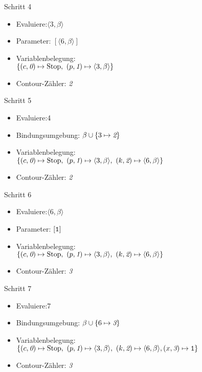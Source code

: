 \documentclass{beamer}
\begin{document}
\begin{frame}
\begin{overprint}
\onslide<+>
\begin{block}{Schritt 4}
\begin{itemize}
\item Evaluiere:\phantom{$\langle$}$\langle 3, \beta\rangle$
\item Parameter: $[\langle6, \beta\rangle]$
\item Variablenbelegung: \\
$\{ (c,\textit 0) \mapsto \text{Stop},\ (p,\textit 1) \mapsto \langle 3 ,\beta\rangle\}$
\item Contour-Zähler: \textit2
\end{itemize}
\end{block}

\onslide<+>
\begin{block}{Schritt 5}
\begin{itemize}
\item Evaluiere:\phantom{$\langle$}4
\item Bindungsumgebung: $\beta \cup \{ 3 \mapsto \textit 2 \}$
\item Variablenbelegung: \\
$\{ (c,\textit 0) \mapsto \text{Stop},\ (p,\textit 1) \mapsto \langle 3 ,\beta\rangle,\ (k,\textit 2) \mapsto \langle6, \beta\rangle\}$
\item Contour-Zähler: \textit2
\end{itemize}
\end{block}

\onslide<+>
\begin{block}{Schritt 6}
\begin{itemize}
\item Evaluiere:\phantom{$\langle$}$\langle6, \beta\rangle$
\item Parameter: $[\text{\tt 1}]$
\item Variablenbelegung: \\
$\{ (c,\textit 0) \mapsto \text{Stop},\ (p,\textit 1) \mapsto \langle 3 ,\beta\rangle,\ (k,\textit 2) \mapsto \langle6, \beta\rangle\}$
\item Contour-Zähler: \textit3
\end{itemize}
\end{block}

\onslide<+>
\begin{block}{Schritt 7}
\begin{itemize}
\item Evaluiere:\phantom{$\langle$}7
\item Bindungsumgebung: $\beta \cup \{ 6 \mapsto \textit 3 \}$
\item Variablenbelegung: \\
$\{ (c,\textit 0) \mapsto \text{Stop},\ (p,\textit 1) \mapsto \langle 3 ,\beta\rangle,\ (k,\textit 2) \mapsto \langle6, \beta\rangle, (x,\textit 3) \mapsto \text{\tt 1}\}$
\item Contour-Zähler: \textit3
\end{itemize}
\end{block}


\end{overprint}
\end{frame}
\end{document}
